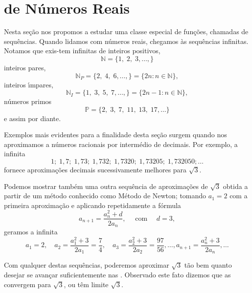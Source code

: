 \section{\Seqs  de N\'{u}meros Reais}
Nesta se\c{c}\~{a}o nos propomos a estudar uma classe especial de fun\c{c}\~{o}es,
chamadas de sequ\^{e}ncias. Quando lidamos com n\'{u}meros reais, chegamos \`{a}s sequ\^{e}ncias infinitas. Notamos que exis-tem \seqs infinitas de inteiros positivos,
\begin{equation*}
    \mathbb{N}=\{1,\; 2, \; 3,\ldots, \}
\end{equation*}
inteiros pares,
\begin{equation*}
    \mathbb{N}_P=\{2,\; 4,\; 6,\ldots,\}=\{2n\colon n\in \mathbb{N} \},
\end{equation*}
inteiros \'{\i}mpares,
\begin{equation*}
    \mathbb{N}_I=\{1,\; 3,\; 5,\; 7,\ldots,\}=\{2n-1\colon n\in \mathbb{N} \},
\end{equation*}
n\'{u}meros primos
\begin{equation*}
    \mathbb{P}=\{2,\; 3,\; 7,\; 11,\; 13,\; 17,\ldots\}
\end{equation*}
 e assim por diante.

 Exemplos mais evidentes para a finalidade desta se\c{c}\~{a}o surgem
 quando nos aproximamos a n\'{u}meros racionais por interm\'{e}dio de decimais. Por exemplo,
 a \seq infinita
\begin{equation*}
    1;\; 1,7;\; 1,73;\; 1,732;\; 1,7320;\; 1,73205;\;1,732050;\ldots
\end{equation*}
fornece aproxima\c{c}\~{o}es decimais sucessivamente melhores para
$\sqrt{3}$.

Podemos mostrar tamb\'{e}m uma outra sequ\^{e}ncia de aproxima\c{c}\~{o}es  de
$\sqrt{3}$ obtida a partir de um  m\'{e}todo conhecido como M\'{e}todo de
Newton; tomando $a_1=2$ com a primeira aproxima\c{c}\~{a}o e aplicando
repetidamente a f\'{o}rmula
\begin{equation*}
    a_{n+1}=\frac{a_n^2+d}{2a_n},\quad\text{ com }\quad d=3,
\end{equation*}
geramos a \seq infinita
\begin{equation*}
    a_1=2,\quad a_2=\frac{a_1^2+3}{2a_1}=\frac{7}{4},\quad a_3=\frac{a_2^2+3}{2a_2}=\frac{97}{56},
    \dots,a_{n+1}=\frac{a_n^2+3}{2a_n},\ldots
\end{equation*}

Com qualquer destas sequ\^{e}ncias, poderemos aproximar $\sqrt{3}$ t\~{a}o
bem quanto desejar se avançar suficientemente nas \seqs. Observado
este fato dizemos que as \seqs convergem para $\sqrt{3}$, ou t\^{e}m
limite $\sqrt{3}$.

